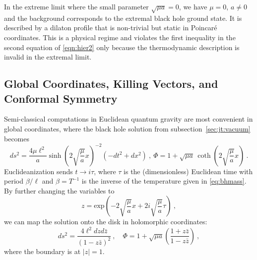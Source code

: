 \documentclass[12pt]{article}
\begin{document}
In the extreme limit where the small parameter $\sqrt{\mu a}=0$, we have $\mu=0$, $a\neq 0$ and the background corresponds to the extremal black hole ground state. It is described by a dilaton profile that is non-trivial but static in Poincar\'e coordinates. This is a physical regime and violates the first inequality in the second equation of \eqref{eqn:hier2} only because the thermodynamic description is invalid in the extremal limit. 


\subsection{Global Coordinates, Killing Vectors, and Conformal Symmetry}
\label{sec:jt:euclid}

Semi-classical computations in Euclidean quantum gravity are most convenient in global coordinates, where the black hole solution from subsection~\ref{sec:jt:vacuum} becomes~\cite{Almheiri:2016fws}
\begin{equation}
	ds^2 = \frac{4 \mu \ell^2}{a} \sinh\left(2\sqrt{\frac{\mu}{a}} x\right)^{-2}\left(-dt^2 + dx^2\right)~,~ \Phi = 1 + \sqrt{\mu a}\,\coth\left(2\sqrt{\frac{\mu}{a}} x\right)~.
\end{equation}
Euclideanization sends $t \to i \tau$, where $\tau$ is the (dimensionless) Euclidean time with period $\beta/\ell$ 
and $\beta=T^{-1}$ is the inverse of the temperature given in \eqref{eq:bhmass}. By further changing the variables to
\begin{equation}
	z = \text{exp}\left(-2\sqrt{\frac{\mu}{a}}x + 2i \sqrt{\frac{\mu}{a}} \tau\right)~,
\end{equation}
we can map the solution onto the disk in holomorphic coordinates:
\begin{equation}
	ds^2 = \frac{4\ell^2 dz d\bar{z}}{(1-z \bar{z})^2}~, \quad \Phi = 1 + \sqrt{\mu a}\left( \frac{1 + z \bar{z}}{1 -z \bar{z}}\right)~,
\label{eq:disk_metric}
\end{equation}
where the boundary is at $|z|=1$.  
\end{document}
